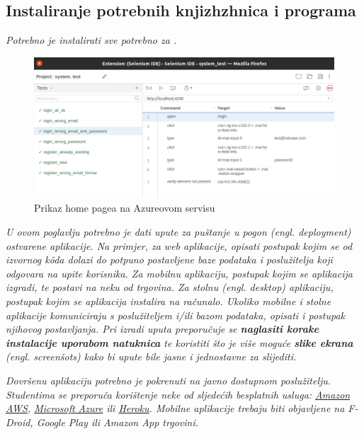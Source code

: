     \subsection{Instaliranje potrebnih knjizhzhnica i programa}
    \textit{Potrebno je instalirati sve potrebno za .}
    \begin{figure}[H]
        \includegraphics[width=\textwidth]{slike/tests_system/login_wrong_email_and_password.png} %
        \caption{Prikaz home pagea na Azureovom servisu}
        \label{fig:struktura} %
    \end{figure}

    \textit{U ovom poglavlju potrebno je dati upute za puštanje u pogon (engl. deployment) ostvarene aplikacije. Na primjer, za web aplikacije, opisati postupak kojim se od izvornog kôda dolazi do potpuno postavljene baze podataka i poslužitelja koji odgovara na upite korisnika. Za mobilnu aplikaciju, postupak kojim se aplikacija izgradi, te postavi na neku od trgovina. Za stolnu (engl. desktop) aplikaciju, postupak kojim se aplikacija instalira na računalo. Ukoliko mobilne i stolne aplikacije komuniciraju s poslužiteljem i/ili bazom podataka, opisati i postupak njihovog postavljanja. Pri izradi uputa preporučuje se \textbf{naglasiti korake instalacije uporabom natuknica} te koristiti što je više moguće \textbf{slike ekrana} (engl. screenšots) kako bi upute bile jasne i jednostavne za slijediti.}
			
			
			 \textit{Dovršenu aplikaciju potrebno je pokrenuti na javno dostupnom poslužitelju. Studentima se preporuča korištenje neke od sljedećih besplatnih usluga: \href{https://aws.amazon.com/}{Amazon AWS}, \href{https://azure.microsoft.com/en-us/}{Microsoft Azure} ili \href{https://www.heroku.com/}{Heroku}. Mobilne aplikacije trebaju biti objavljene na F-Droid, Google Play ili Amazon App trgovini.}
			
			
			\eject 